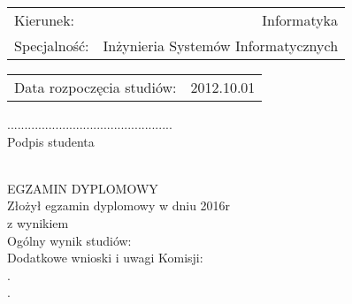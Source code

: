 \noindent
\begin{minipage}{0.75\textwidth}
    \begin{flushleft} \normalsize
        \def\arraystretch{2}
            \begin{tabular}{ p{3cm} r }
Kierunek: & Informatyka \\
Specjalność: & Inżynieria Systemów Informatycznych\\

            \end{tabular}
            \begin{tabular}{ p{8cm} r}
Data rozpoczęcia studiów: & 2012.10.01 \\
            \end{tabular}
    \end{flushleft}
\end{minipage}

\vfill

\begin{flushright}
    \begin{minipage}{5.8cm}
        \begin{center}
            ................................................\\
            Podpis studenta
        \end{center}
    \end{minipage}
\end{flushright}

~\\[0.5cm]

\noindent
EGZAMIN DYPLOMOWY\\
Złożył egzamin dyplomowy w dniu \dotfill 2016r\\
z wynikiem \dotfill \\
Ogólny wynik studiów: \dotfill \\
Dodatkowe wnioski i uwagi Komisji: \dotfill \\
.\dotfill \\
.\dotfill \\
